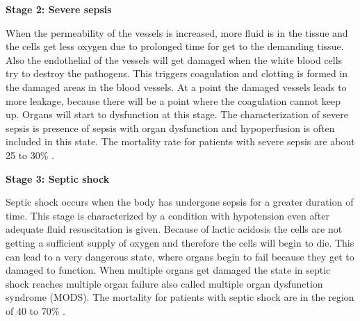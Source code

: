 \textbf{Stage 2: Severe sepsis}

When the permeability of the vessels is increased, more fluid is in the tissue and the cells get less oxygen due to prolonged time for get to the demanding tissue. Also the endothelial of the vessels will get damaged when the white blood cells try to destroy the pathogens. This triggers coagulation and clotting is formed in the damaged areas in the blood vessels. At a point the damaged vessels leads to more leakage, because there will be a point where the coagulation cannot keep up. Organs will start to dysfunction at this stage. The characterization of severe sepsis is presence of sepsis with organ dysfunction and hypoperfusion is often included in this state. The mortality rate for patients with severe sepsis are about 25 to 30\% \cite{baudouin2008,kanta2014}. 


\textbf{Stage 3: Septic shock}

Septic shock occurs when the body has undergone sepsis for a greater duration of time. This stage is characterized by a condition with hypotension even after adequate fluid resuscitation is given. Because of lactic acidosis the cells are not getting a sufficient supply of oxygen and therefore the cells will begin to die. This can lead to a very dangerous state, where organs begin to fail because they get to damaged to function. When multiple organs get damaged the state in septic shock reaches multiple organ failure also called multiple organ dysfunction syndrome (MODS)\cite{baudouin2008,kanta2014}. The mortality for patients with septic shock are in the region of 40 to 70\% \cite{kanta2014}. 

